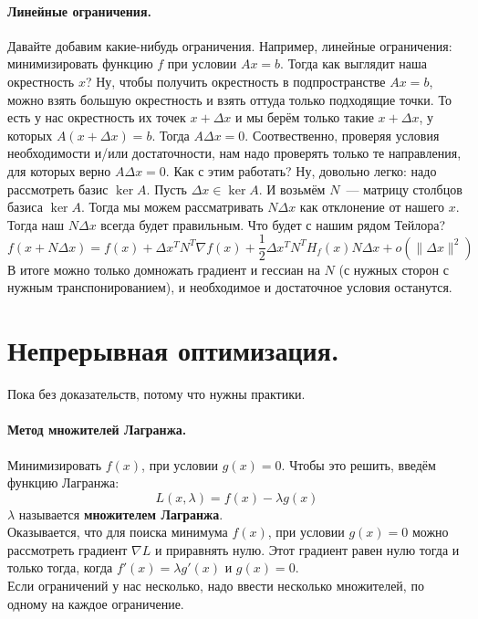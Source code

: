 \documentclass{article}
\begin{document}
    \paragraph{Линейные ограничения.}
    Давайте добавим какие-нибудь ограничения. Например, линейные ограничения: минимизировать функцию $f$ при условии $Ax=b$. Тогда как выглядит наша окрестность $x$? Ну, чтобы получить окрестность в подпространстве $Ax=b$, можно взять большую окрестность и взять оттуда только подходящие точки. То есть у нас окрестность их точек $x+\Delta x$ и мы берём только такие $x+\Delta x$, у которых $A(x+\Delta x)=b$. Тогда $A\Delta x=0$. Соотвественно, проверяя условия необходимости и/или достаточности, нам надо проверять только те направления, для которых верно $A\Delta x=0$. Как с этим работать? Ну, довольно легко: надо рассмотреть базис $\ker A$. Пусть $\Delta x\in\ker A$. И возьмём $N$~--- матрицу столбцов базиса $\ker A$. Тогда мы можем рассматривать $N\Delta x$ как отклонение от нашего $x$. Тогда наш $N\Delta x$ всегда будет правильным. Что будет с нашим рядом Тейлора?
    \[
    f(x+N\Delta x)=f(x)+\Delta x^TN^T\nabla f(x)+\frac12\Delta x^TN^TH_f(x)N\Delta x+o(\|\Delta x\|^2)
    \]
    В итоге можно только домножать градиент и гессиан на $N$ (с нужных сторон с нужным транспонированием), и необходимое и достаточное условия останутся.
    \section{Непрерывная оптимизация.}
    Пока без доказательств, потому что нужны практики.
    \paragraph{Метод множителей Лагранжа.}
    Минимизировать $f(x)$, при условии $g(x)=0$. Чтобы это решить, введём функцию Лагранжа:
    $$
    L(x,\lambda)=f(x)-\lambda g(x)
    $$
    $\lambda$ называется \textbf{множителем Лагранжа}.\\
    Оказывается, что для поиска минимума $f(x)$, при условии $g(x)=0$ можно рассмотреть градиент $\nabla L$ и приравнять нулю. Этот градиент равен нулю тогда и только тогда, когда $f'(x)=\lambda g'(x)$ и $g(x)=0$.\\
    Если ограничений у нас несколько, надо ввести несколько множителей, по одному на каждое ограничение.
\end{document}
